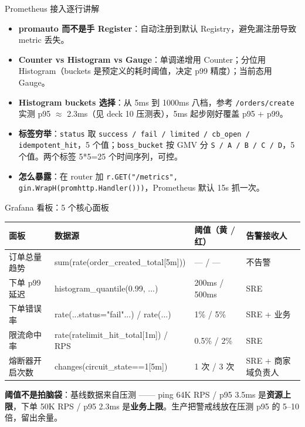 \documentclass[aspectratio=169,11pt]{beamer}
\begin{document}
\begin{frame}[shrink]{Prometheus 接入逐行讲解}
\begin{itemize}
  \item \textbf{promauto 而不是手 Register}：自动注册到默认 Registry，避免漏注册导致 metric 丢失。
  \item \textbf{Counter vs Histogram vs Gauge}：单调递增用 Counter；分位用 Histogram（buckets 是预定义的耗时阈值，决定 p99 精度）；当前态用 Gauge。
  \item \textbf{Histogram buckets 选择}：从 5ms 到 1000ms 八档，参考 \texttt{/orders/create} 实测 p95 $\approx$ 2.3ms（见 deck 10 压测表），5ms 起步刚好覆盖 p95 + p99。
  \item \textbf{标签穷举}：\texttt{status} 取 \texttt{success / fail / limited / cb\_open / idempotent\_hit}，5 个值；\texttt{boss\_bucket} 按 GMV 分 \texttt{S / A / B / C / D}，5 个值。两个标签 5*5=25 个时间序列，可控。
  \item \textbf{怎么暴露}：在 router 加 \texttt{r.GET("/metrics", gin.WrapH(promhttp.Handler()))}，Prometheus 默认 15s 抓一次。
\end{itemize}
\end{frame}

\begin{frame}[shrink]{Grafana 看板：5 个核心面板}
\scriptsize
\begin{tabular}{@{}llll@{}}
\toprule
面板 & 数据源 & 阈值（黄 / 红） & 告警接收人 \\
\midrule
订单总量趋势    & sum(rate(order\_created\_total[5m])) & --- / --- & 不告警 \\
下单 p99 延迟  & histogram\_quantile(0.99, ...) & 200ms / 500ms & SRE \\
下单错误率      & rate(...status="fail"...) / rate(...) & 1\% / 5\% & SRE + 业务 \\
限流命中率      & rate(ratelimit\_hit\_total[1m]) / RPS & 0.5\% / 2\% & SRE \\
熔断器开启次数 & changes(circuit\_state==1[5m]) & 1 次 / 3 次 & SRE + 商家域负责人 \\
\bottomrule
\end{tabular}
\vspace{2mm}
\small \textbf{阈值不是拍脑袋}：基线数据来自压测 —— ping 64K RPS / p95 3.5ms 是\textbf{资源上限}，下单 50K RPS / p95 2.3ms 是\textbf{业务上限}。生产把警戒线放在压测 p95 的 5--10 倍，留出余量。
\end{frame}

\end{document}
